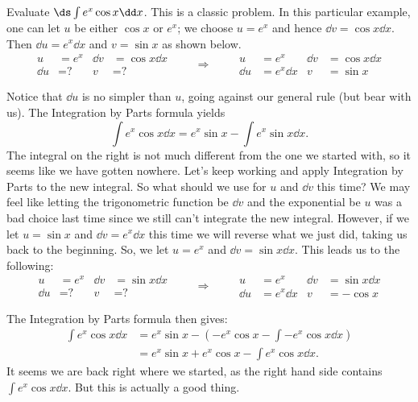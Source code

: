 \begin{example}\label{ex_ibp4}%
Evaluate $\ds\int e^x\cos x\dd x$.
\solution
This is a classic problem.
In this particular example, one can let $u$ be either $\cos x$ or $e^x$;
we choose $u=e^x$ and hence $\dd v = \cos x\dd x$.  Then $\dd u=e^x\dd x$ and $v=\sin x$ as shown below.
\[
\begin{aligned}
u&= e^x & \dd v&=\cos x\dd x\\
\dd u&= \text{?} & v&=\text{?}
\end{aligned}
\qquad\Rightarrow\qquad
\begin{aligned}
u&= e^x& \dd v&=\cos x\dd x\\
\dd u&= e^x\dd x & v&=\sin x
\end{aligned}
\]

Notice that $\dd u$ is no simpler than $u$, going against our general rule (but bear with us). The Integration by Parts formula yields
\[\int e^x\cos x\dd x = e^x\sin x - \int e^x\sin x\dd x.\]
The integral on the right is not much different from the one we started with, so it seems like we have gotten nowhere. Let's keep working and apply Integration by Parts to the new integral. So what should we use for $u$ and $\dd v$ this time? We may feel like letting the trigonometric function be $\dd v$ and the exponential be $u$ was a bad choice last time since we still can't integrate the new integral. However, if we let $u=\sin x$ and $\dd v=e^x\dd x$ this time we will reverse what we just did, taking us back to the beginning. So, we let $u=e^x$ and $\dd v = \sin x\dd x$. This leads us to the following:
\[
\begin{aligned}
u&= e^x & \dd v&=\sin x\dd x\\
\dd u&= \text{?} & v&=\text{?}
\end{aligned}
\qquad\Rightarrow\qquad
\begin{aligned}
u&= e^x& \dd v&=\sin x\dd x\\
\dd u&= e^x\dd x & v&=-\cos x
\end{aligned}
\]

The Integration by Parts formula then gives:
\begin{align*}
 \int e^x\cos x\dd x
 &= e^x\sin x - \left(-e^x\cos x - \int -e^x\cos x\dd x\right)\\
 &= e^x\sin x+ e^x\cos x - \int e^x\cos x\dd x.
\end{align*}
It seems we are back right where we started, as the right hand side contains $\int e^x\cos x\dd x$.  But this is actually a good thing.  


\end{example}
